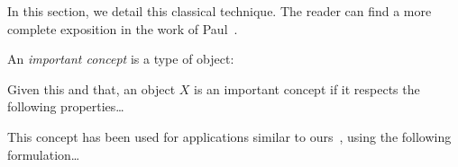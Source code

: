 %



%
In this section, we detail this classical technique. The reader can find a more complete exposition in the work of Paul~\cite{Sibgrapi2014}.


%
An \emph{important concept} is a type of object:
\begin{definition}
Given this and that, an object $X$ is an important concept if it respects the following properties\ldots{}
\end{definition}


%
This concept has been used for applications similar to ours~\cite{Sibgrapi2014}, using the following formulation\ldots{}